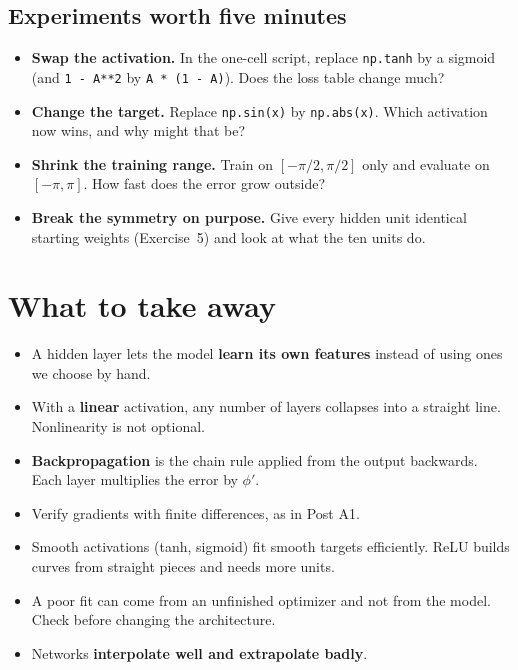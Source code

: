 \documentclass[11pt]{article}
\begin{document}
\subsection{Experiments worth five minutes}
\begin{itemize}[nosep]
  \item \textbf{Swap the activation.} In the one-cell script, replace \texttt{np.tanh} by a sigmoid (and \texttt{1 - A**2} by \texttt{A * (1 - A)}). Does the loss table change much?
  \item \textbf{Change the target.} Replace \texttt{np.sin(x)} by \texttt{np.abs(x)}. Which activation now wins, and why might that be?
  \item \textbf{Shrink the training range.} Train on $[-\pi/2,\pi/2]$ only and evaluate on $[-\pi,\pi]$. How fast does the error grow outside?
  \item \textbf{Break the symmetry on purpose.} Give every hidden unit identical starting weights (Exercise~5) and look at what the ten units do.
\end{itemize}

\section{What to take away}
\begin{keybox}[Summary]
\begin{itemize}[nosep]
  \item A hidden layer lets the model \textbf{learn its own features} instead of using ones we choose by hand.
  \item With a \textbf{linear} activation, any number of layers collapses into a straight line. Nonlinearity is not optional.
  \item \textbf{Backpropagation} is the chain rule applied from the output backwards. Each layer multiplies the error by $\phi'$.
  \item Verify gradients with finite differences, as in Post A1.
  \item Smooth activations (tanh, sigmoid) fit smooth targets efficiently. ReLU builds curves from straight pieces and needs more units.
  \item A poor fit can come from an unfinished optimizer and not from the model. Check before changing the architecture.
  \item Networks \textbf{interpolate well and extrapolate badly}.
\end{itemize}
\end{keybox}
\end{document}
